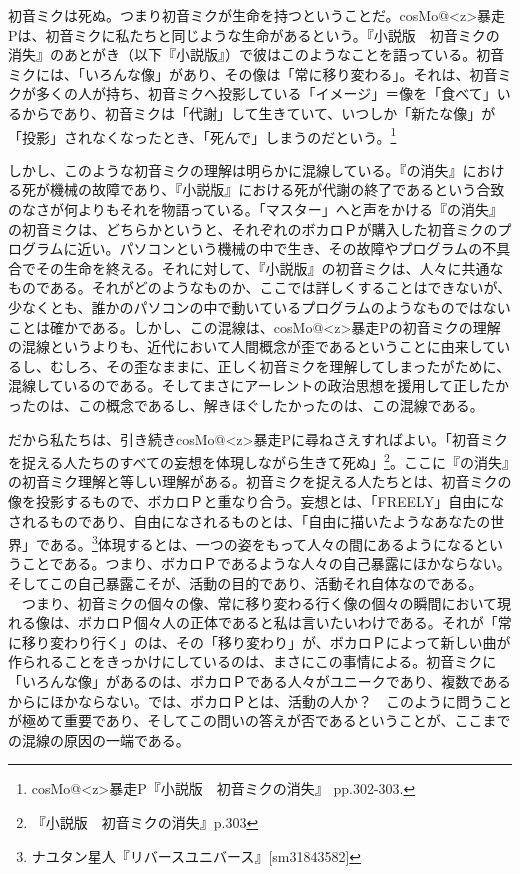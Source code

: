 \documentclass[b5j,twoside,twocolumn]{utarticle}
\begin{document}
初音ミクは死ぬ。つまり初音ミクが生命を持つということだ。cosMo@\pbox<z>{暴走}Pは、初音ミクに私たちと同じような生命があるという。『小説版　初音ミクの消失』のあとがき（以下『小説版』）で彼はこのようなことを語っている。初音ミクには、「いろんな像」があり、その像は「常に移り変わる」。それは、初音ミクが多くの人が持ち、初音ミクへ投影している「イメージ」＝像を「食べて」いるからであり、初音ミクは「代謝」して生きていて、いつしか「新たな像」が「投影」されなくなったとき、「死んで」しまうのだという。\footnote{cosMo@\pbox<z>{暴走}P『小説版　初音ミクの消失』 pp.302-303.}


しかし、このような初音ミクの理解は明らかに混線している。『の消失』における死が機械の故障であり、『小説版』における死が代謝の終了であるという合致のなさが何よりもそれを物語っている。「マスター」へと声をかける『の消失』の初音ミクは、どちらかというと、それぞれのボカロＰが購入した初音ミクのプログラムに近い。パソコンという機械の中で生き、その故障やプログラムの不具合でその生命を終える。それに対して、『小説版』の初音ミクは、人々に共通なものである。それがどのようなものか、ここでは詳しくすることはできないが、少なくとも、誰かのパソコンの中で動いているプログラムのようなものではないことは確かである。しかし、この混線は、cosMo@\pbox<z>{暴走}Pの初音ミクの理解の混線というよりも、近代において人間概念が歪であるということに由来しているし、むしろ、その歪なままに、正しく初音ミクを理解してしまったがために、混線しているのである。そしてまさにアーレントの政治思想を援用して正したかったのは、この概念であるし、解きほぐしたかったのは、この混線である。


だから私たちは、引き続きcosMo@\pbox<z>{暴走}Pに尋ねさえすればよい。「初音ミクを捉える人たちのすべての妄想を体現しながら生きて死ぬ」\footnote{『小説版　初音ミクの消失』p.303}。ここに『の消失』の初音ミク理解と等しい理解がある。初音ミクを捉える人たちとは、初音ミクの像を投影するもので、ボカロＰと重なり合う。妄想とは、「FREELY」自由になされるものであり、自由になされるものとは、「自由に描いたようなあなたの世界」である。\footnote{ナユタン星人『リバースユニバース』[sm31843582]}体現するとは、一つの姿をもって人々の間にあるようになるということである。つまり、ボカロＰであるような人々の自己暴露にほかならない。そしてこの自己暴露こそが、活動の目的であり、活動それ自体なのである。
　つまり、初音ミクの個々の像、常に移り変わる行く像の個々の瞬間において現れる像は、ボカロＰ個々人の正体であると私は言いたいわけである。それが「常に移り変わり行く」のは、その「移り変わり」が、ボカロＰによって新しい曲が作られることをきっかけにしているのは、まさにこの事情による。初音ミクに「いろんな像」があるのは、ボカロＰである人々がユニークであり、複数であるからにほかならない。では、ボカロＰとは、活動の人か？　このように問うことが極めて重要であり、そしてこの問いの答えが否であるということが、ここまでの混線の原因の一端である。
\end{document}
